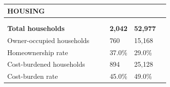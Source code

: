 \documentclass[9pt]{report}
\begin{document}
\vspace{12pt}
\setlength{\tabcolsep}{.01in} %
\begin{tabular}{p{.10in}p{.10in}p{.10in}p{3.7in}>{\hfill}p{.85in}>{\hfill}p{.85in}>{\hfill}p{.85in}>{\hfill}p{.85in}p{0.1in}}
\multicolumn{9}{l}{\parbox{7.1in}{\raggedright{\large{\strut\textbf{HOUSING}\strut}}}} \\ 
\hline
\multicolumn{4}{l}{\parbox{3.5in}{\raggedright{\textbf{}}}} & \multicolumn{1}{r}{\parbox{.85in}{\strut\raggedleft{\textbf{}\strut}}} & \multicolumn{1}{r}{\parbox{.85in}{\strut\raggedleft{\textbf{}\strut}}} & \multicolumn{1}{r}{\parbox{.85in}{\strut{}}} & \multicolumn{1}{r}{\parbox{.85in}{\strut{}}} & \\ 
\multicolumn{9}{l}{} \\ 
\multicolumn{4}{l}{\parbox{3.5in}{\strut\raggedright{\textbf{Total households}\strut}}} & \textbf{} & \textbf{} & \textbf{2,042} & \textbf{52,977} & \textbf{} \\ 
\multicolumn{4}{l}{\parbox{3.6in}{\strut\raggedright{{Owner-occupied households}}\strut}} &  &  & 760 & 15,168 & \multicolumn{1}{l}{}  \\ 
\multicolumn{4}{l}{\parbox{3.6in}{\strut\raggedright{{Homeownership rate}}\strut}} &  &  & 37.0\% & 29.0\% & \multicolumn{1}{l}{}  \\ 
\multicolumn{4}{l}{\parbox{3.6in}{\strut\raggedright{{Cost-burdened households}}\strut}} &  &  & 894 & 25,128 & \multicolumn{1}{l}{}  \\ 
\multicolumn{4}{l}{\parbox{3.6in}{\strut\raggedright{{Cost-burden rate}}\strut}} &  &  & 45.0\% & 49.0\% & \multicolumn{1}{l}{}  \\ 

\end{tabular}
\setlength{\tabcolsep}{6pt} %
\end{document}
